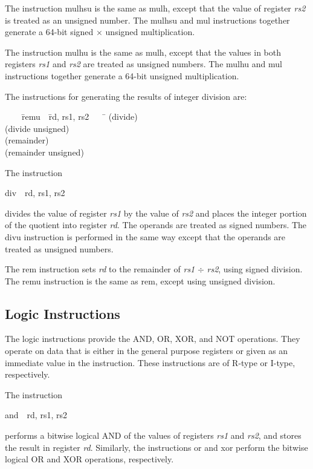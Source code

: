 \documentclass[11pt, twoside, pdftex]{article}
\newenvironment{ctabbing}%
{\begin{center}\begin{minipage}{\textwidth}\begin{tabbing}}
{\end{tabbing}\end{minipage}\end{center}}
\begin{document}
The instruction {\sf mulhsu} is the same as {\sf mulh}, except that the value of register
{\it rs2} is treated as an unsigned number.  The {\sf mulhsu} and {\sf mul} instructions 
together generate a 64-bit signed $\times$ unsigned multiplication.
 
The instruction {\sf mulhu} is the same as {\sf mulh}, except that the values in both
registers {\it rs1} and {\it rs2} are treated as unsigned numbers.  The {\sf mulhu} and
{\sf mul} instructions together generate a 64-bit unsigned multiplication.

\newpage
The instructions for generating the results of integer division are:
\vspace{-\baselineskip}
\begin{ctabbing}
~~~~\={\sf remu}~~\={\sf rd, rs1, rs2}~~~~\=\kill
{} \>(divide)\\
 \>(divide unsigned)\\
 \>(remainder)\\
 \>(remainder unsigned)
\end{ctabbing}

\noindent
The instruction
\vspace{-\baselineskip}
\begin{center}
{\sf div~~rd, rs1, rs2}
\end{center}
\noindent
divides the value of register {\it rs1} by the value of {\it rs2} and places the integer
portion of the quotient into register {\it rd}. The operands are treated as signed numbers.
The {\sf divu} instruction is performed in the same way except that the operands are treated 
as unsigned numbers.

The {\sf rem} instruction sets {\it rd} to the remainder of {\it rs1} $\div$ {\it rs2},
using signed division. The {\sf remu} instruction is the same as {\sf rem}, except using unsigned
division.

\subsection{Logic Instructions}

The logic instructions provide the AND, OR, XOR, and NOT operations. They operate on data
that is either in the general purpose registers or given as an immediate value in the instruction. 
These instructions are of R-type or I-type, respectively.

\noindent
The instruction
\vspace{-\baselineskip}
\begin{center}
{\sf and~~rd, rs1, rs2} 
\end{center}
\noindent
performs a bitwise logical AND of the values of registers {\it rs1} and {\it rs2}, and stores 
the result in register {\it rd}. Similarly, the instructions {\sf or} and {\sf xor}
perform the bitwise logical OR and XOR operations, respectively.
\end{document}
